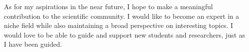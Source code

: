 As for my aspirations in the near future, I hope to make a meaningful contribution to the scientific community. I would like to become an expert in a niche field while also maintaining a broad perspective on interesting topics. I would love to be able to guide and support new students and researchers, just as I have been guided.

